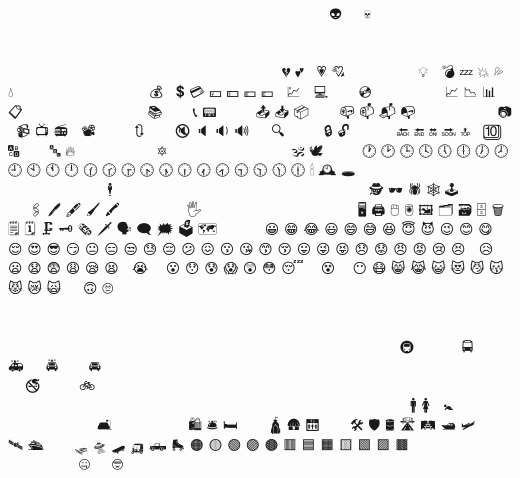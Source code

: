 \documentclass{article}
\begin{document}
👳🏼 👳🏽‍♀️ 👳🏽‍♂️ 👳🏽 👳🏾‍♀️ 👳🏾‍♂️ 👳🏾 👳🏿‍♀️ 👳🏿‍♂️ 👳🏿 👳‍♀️ 👳‍♂️ 👳 👴🏻 👴🏼 👴🏽 👴🏾 👴🏿 👴 👵🏻 👵🏼 👵🏽 👵🏾 👵🏿 👵 👶🏻 👶🏼 👶🏽 👶🏾 👶🏿 👶 👷🏻‍♀️ 👷🏻‍♂️ 👷🏻 👷🏼‍♀️ 👷🏼‍♂️ 👷🏼 👷🏽‍♀️ 👷🏽‍♂️ 👷🏽 👷🏾‍♀️ 👷🏾‍♂️ 👷🏾 👷🏿‍♀️ 👷🏿‍♂️ 👷🏿 👷‍♀️ 👷‍♂️ 👷 👸🏻 👸🏼 👸🏽 👸🏾 👸🏿 👸 👹 👺 👻 👼🏻 👼🏼 👼🏽 👼🏾 👼🏿 👼 👽 👾 👿 💀 💁🏻‍♀️ 💁🏻‍♂️ 💁🏻 💁🏼‍♀️ 💁🏼‍♂️ 💁🏼 💁🏽‍♀️ 💁🏽‍♂️ 💁🏽 💁🏾‍♀️ 💁🏾‍♂️ 💁🏾 💁🏿‍♀️ 💁🏿‍♂️ 💁🏿 💁‍♀️ 💁‍♂️ 💁 💂🏻‍♀️ 💂🏻‍♂️ 💂🏻 💂🏼‍♀️ 💂🏼‍♂️ 💂🏼 💂🏽‍♀️ 💂🏽‍♂️ 💂🏽 💂🏾‍♀️ 💂🏾‍♂️ 💂🏾 💂🏿‍♀️ 💂🏿‍♂️ 💂🏿 💂‍♀️ 💂‍♂️ 💂 💃🏻 💃🏼 💃🏽 💃🏾 💃🏿 💃 💄 💅🏻 💅🏼 💅🏽 💅🏾 💅🏿 💅 💆🏻‍♀️ 💆🏻‍♂️ 💆🏻 💆🏼‍♀️ 💆🏼‍♂️ 💆🏼 💆🏽‍♀️ 💆🏽‍♂️ 💆🏽 💆🏾‍♀️ 💆🏾‍♂️ 💆🏾 💆🏿‍♀️ 💆🏿‍♂️ 💆🏿 💆‍♀️ 💆‍♂️ 💆 💇🏻‍♀️ 💇🏻‍♂️ 💇🏻 💇🏼‍♀️ 💇🏼‍♂️ 💇🏼 💇🏽‍♀️ 💇🏽‍♂️ 💇🏽 💇🏾‍♀️ 💇🏾‍♂️ 💇🏾 💇🏿‍♀️ 💇🏿‍♂️ 💇🏿 💇‍♀️ 💇‍♂️ 💇 💈 💉 💊 💋 💌 💍 💎 💏🏻 💏🏼 💏🏽 💏🏾 💏🏿 💏 💐 💑🏻 💑🏼 💑🏽 💑🏾 💑🏿 💑 💒 💓 💔 💕 💖 💗 💘 💙 💚 💛 💜 💝 💞 💟 💠 💡 💢 💣 💤 💥 💦 💧 💨 💩 💪🏻 💪🏼 💪🏽 💪🏾 💪🏿 💪 💫 💬 💭 💮 💯 💰 💱 💲 💳 💴 💵 💶 💷 💸 💹 💺 💻 💼 💽 💾 💿 📀 📁 📂 📃 📄 📅 📆 📇 📈 📉 📊 📋 📌 📍 📎 📏 📐 📑 📒 📓 📔 📕 📖 📗 📘 📙 📚 📛 📜 📝 📞 📟 📠 📡 📢 📣 📤 📥 📦 📧 📨 📩 📪 📫 📬 📭 📮 📯 📰 📱 📲 📳 📴 📵 📶 📷 📸 📹 📺 📻 📼 📽 📿 🔀 🔁 🔂 🔃 🔄 🔅 🔆 🔇 🔈 🔉 🔊 🔋 🔌 🔍 🔎 🔏 🔐 🔑 🔒 🔓 🔔 🔕 🔖 🔗 🔘 🔙 🔚 🔛 🔜 🔝 🔞 🔟 🔠 🔡 🔢 🔣 🔤 🔥 🔦 🔧 🔨 🔩 🔪 🔫 🔬 🔭 🔮 🔯 🔰 🔱 🔲 🔳 🔴 🔵 🔶 🔷 🔸 🔹 🔺 🔻 🔼 🔽 🕉 🕊 🕋 🕌 🕍 🕎 🕐 🕑 🕒 🕓 🕔 🕕 🕖 🕗 🕘 🕙 🕚 🕛 🕜 🕝 🕞 🕟 🕠 🕡 🕢 🕣 🕤 🕥 🕦 🕧 🕯 🕰 🕳 🕴🏻‍♀️ 🕴🏻‍♂️ 🕴🏻 🕴🏼‍♀️ 🕴🏼‍♂️ 🕴🏼 🕴🏽‍♀️ 🕴🏽‍♂️ 🕴🏽 🕴🏾‍♀️ 🕴🏾‍♂️ 🕴🏾 🕴🏿‍♀️ 🕴🏿‍♂️ 🕴🏿 🕴️‍♀️ 🕴️‍♂️ 🕴 🕵🏻‍♀️ 🕵🏻‍♂️ 🕵🏻 🕵🏼‍♀️ 🕵🏼‍♂️ 🕵🏼 🕵🏽‍♀️ 🕵🏽‍♂️ 🕵🏽 🕵🏾‍♀️ 🕵🏾‍♂️ 🕵🏾 🕵🏿‍♀️ 🕵🏿‍♂️ 🕵🏿 🕵️‍♀️ 🕵️‍♂️ 🕵 🕶 🕷 🕸 🕹 🕺🏻 🕺🏼 🕺🏽 🕺🏾 🕺🏿 🕺 🖇 🖊 🖋 🖌 🖍 🖐🏻 🖐🏼 🖐🏽 🖐🏾 🖐🏿 🖐 🖕🏻 🖕🏼 🖕🏽 🖕🏾 🖕🏿 🖕 🖖🏻 🖖🏼 🖖🏽 🖖🏾 🖖🏿 🖖 🖤 🖥 🖨 🖱 🖲 🖼 🗂 🗃 🗄 🗑 🗒 🗓 🗜 🗝 🗞 🗡 🗣 🗨 🗯 🗳 🗺 🗻 🗼 🗽 🗾 🗿 😀 😁 😂 😃 😄 😅 😆 😇 😈 😉 😊 😋 😌 😍 😎 😏 😐 😑 😒 😓 😔 😕 😖 😗 😘 😙 😚 😛 😜 😝 😞 😟 😠 😡 😢 😣 😤 😥 😦 😧 😨 😩 😪 😫 😬 😭 😮‍💨 😮 😯 😰 😱 😲 😳 😴 😵‍💫 😵 😶‍🌫️ 😶 😷 😸 😹 😺 😻 😼 😽 😾 😿 🙀 🙁 🙂 🙃 🙄 🙅🏻‍♀️ 🙅🏻‍♂️ 🙅🏻 🙅🏼‍♀️ 🙅🏼‍♂️ 🙅🏼 🙅🏽‍♀️ 🙅🏽‍♂️ 🙅🏽 🙅🏾‍♀️ 🙅🏾‍♂️ 🙅🏾 🙅🏿‍♀️ 🙅🏿‍♂️ 🙅🏿 🙅‍♀️ 🙅‍♂️ 🙅 🙆🏻‍♀️ 🙆🏻‍♂️ 🙆🏻 🙆🏼‍♀️ 🙆🏼‍♂️ 🙆🏼 🙆🏽‍♀️ 🙆🏽‍♂️ 🙆🏽 🙆🏾‍♀️ 🙆🏾‍♂️ 🙆🏾 🙆🏿‍♀️ 🙆🏿‍♂️ 🙆🏿 🙆‍♀️ 🙆‍♂️ 🙆 🙇🏻‍♀️ 🙇🏻‍♂️ 🙇🏻 🙇🏼‍♀️ 🙇🏼‍♂️ 🙇🏼 🙇🏽‍♀️ 🙇🏽‍♂️ 🙇🏽 🙇🏾‍♀️ 🙇🏾‍♂️ 🙇🏾 🙇🏿‍♀️ 🙇🏿‍♂️ 🙇🏿 🙇‍♀️ 🙇‍♂️ 🙇 🙈 🙉 🙊 🙋🏻‍♀️ 🙋🏻‍♂️ 🙋🏻 🙋🏼‍♀️ 🙋🏼‍♂️ 🙋🏼 🙋🏽‍♀️ 🙋🏽‍♂️ 🙋🏽 🙋🏾‍♀️ 🙋🏾‍♂️ 🙋🏾 🙋🏿‍♀️ 🙋🏿‍♂️ 🙋🏿 🙋‍♀️ 🙋‍♂️ 🙋 🙌🏻 🙌🏼 🙌🏽 🙌🏾 🙌🏿 🙌 🙍🏻‍♀️ 🙍🏻‍♂️ 🙍🏻 🙍🏼‍♀️ 🙍🏼‍♂️ 🙍🏼 🙍🏽‍♀️ 🙍🏽‍♂️ 🙍🏽 🙍🏾‍♀️ 🙍🏾‍♂️ 🙍🏾 🙍🏿‍♀️ 🙍🏿‍♂️ 🙍🏿 🙍‍♀️ 🙍‍♂️ 🙍 🙎🏻‍♀️ 🙎🏻‍♂️ 🙎🏻 🙎🏼‍♀️ 🙎🏼‍♂️ 🙎🏼 🙎🏽‍♀️ 🙎🏽‍♂️ 🙎🏽 🙎🏾‍♀️ 🙎🏾‍♂️ 🙎🏾 🙎🏿‍♀️ 🙎🏿‍♂️ 🙎🏿 🙎‍♀️ 🙎‍♂️ 🙎 🙏🏻 🙏🏼 🙏🏽 🙏🏾 🙏🏿 🙏 🚀 🚁 🚂 🚃 🚄 🚅 🚆 🚇 🚈 🚉 🚊 🚋 🚌 🚍 🚎 🚏 🚐 🚑 🚒 🚓 🚔 🚕 🚖 🚗 🚘 🚙 🚚 🚛 🚜 🚝 🚞 🚟 🚠 🚡 🚢 🚣🏻‍♀️ 🚣🏻‍♂️ 🚣🏻 🚣🏼‍♀️ 🚣🏼‍♂️ 🚣🏼 🚣🏽‍♀️ 🚣🏽‍♂️ 🚣🏽 🚣🏾‍♀️ 🚣🏾‍♂️ 🚣🏾 🚣🏿‍♀️ 🚣🏿‍♂️ 🚣🏿 🚣‍♀️ 🚣‍♂️ 🚣 🚤 🚥 🚦 🚧 🚨 🚩 🚪 🚫 🚬 🚭 🚮 🚯 🚰 🚱 🚲 🚳 🚴🏻‍♀️ 🚴🏻‍♂️ 🚴🏻 🚴🏼‍♀️ 🚴🏼‍♂️ 🚴🏼 🚴🏽‍♀️ 🚴🏽‍♂️ 🚴🏽 🚴🏾‍♀️ 🚴🏾‍♂️ 🚴🏾 🚴🏿‍♀️ 🚴🏿‍♂️ 🚴🏿 🚴‍♀️ 🚴‍♂️ 🚴 🚵🏻‍♀️ 🚵🏻‍♂️ 🚵🏻 🚵🏼‍♀️ 🚵🏼‍♂️ 🚵🏼 🚵🏽‍♀️ 🚵🏽‍♂️ 🚵🏽 🚵🏾‍♀️ 🚵🏾‍♂️ 🚵🏾 🚵🏿‍♀️ 🚵🏿‍♂️ 🚵🏿 🚵‍♀️ 🚵‍♂️ 🚵 🚶🏻‍♀️ 🚶🏻‍♂️ 🚶🏻 🚶🏼‍♀️ 🚶🏼‍♂️ 🚶🏼 🚶🏽‍♀️ 🚶🏽‍♂️ 🚶🏽 🚶🏾‍♀️ 🚶🏾‍♂️ 🚶🏾 🚶🏿‍♀️ 🚶🏿‍♂️ 🚶🏿 🚶‍♀️ 🚶‍♂️ 🚶 🚷 🚸 🚹 🚺 🚻 🚼 🚽 🚾 🚿 🛀🏻 🛀🏼 🛀🏽 🛀🏾 🛀🏿 🛀 🛁 🛂 🛃 🛄 🛅 🛋 🛌🏻 🛌🏼 🛌🏽 🛌🏾 🛌🏿 🛌 🛍 🛎 🛏 🛐 🛑 🛒 🛕 🛖 🛗 🛝 🛞 🛟 🛠 🛡 🛢 🛣 🛤 🛥 🛩 🛫 🛬 🛰 🛳 🛴 🛵 🛶 🛷 🛸 🛹 🛺 🛻 🛼 🟠 🟡 🟢 🟣 🟤 🟥 🟦 🟧 🟨 🟩 🟪 🟫 🟰 🤌🏻 🤌🏼 🤌🏽 🤌🏾 🤌🏿 🤌 🤍 🤎 🤏🏻 🤏🏼 🤏🏽 🤏🏾 🤏🏿 🤏 🤐 🤑 🤒 🤓 🤔 🤕 🤖 🤗 🤘🏻 🤘🏼 🤘🏽 🤘🏾 🤘🏿 🤘 🤙🏻 🤙🏼 🤙🏽 🤙🏾 🤙🏿 🤙 🤚🏻 🤚🏼 🤚🏽 🤚🏾 🤚🏿 🤚 🤛🏻 🤛🏼 🤛🏽 🤛🏾 🤛🏿 🤛 🤜🏻 🤜🏼 🤜🏽 🤜🏾 🤜🏿 🤜 🤝🏻 🤝🏼 🤝🏽 🤝🏾 🤝🏿 🤝 🤞🏻 🤞🏼 🤞🏽 🤞🏾 🤞🏿 🤞 🤟🏻 🤟🏼 🤟🏽 🤟🏾 🤟🏿 🤟 🤠 🤡 🤢 🤣 🤤 🤥 🤦🏻‍♀️ 🤦🏻‍♂️ 🤦🏻 🤦🏼‍♀️ 🤦🏼‍♂️ 🤦🏼 🤦🏽‍♀️ 🤦🏽‍♂️ 🤦🏽 🤦🏾‍♀️ 🤦🏾‍♂️ 🤦🏾 🤦🏿‍♀️ 🤦🏿‍♂️ 🤦🏿 🤦‍♀️ 🤦‍♂️ 🤦 🤧 🤨 🤩 🤪 🤫 🤬 🤭 🤮 🤯 🤰🏻 🤰🏼 🤰🏽 🤰🏾 🤰🏿 🤰 🤱🏻 🤱🏼 🤱🏽 🤱🏾 🤱🏿 🤱 🤲🏻 🤲🏼 🤲🏽 🤲🏾 🤲🏿 🤲 🤳🏻 🤳🏼 🤳🏽 🤳🏾 🤳🏿 🤳 🤴🏻 🤴🏼 🤴🏽 🤴🏾 🤴🏿 🤴 🤵🏻‍♀️ 🤵🏻‍♂️ 🤵🏻 🤵🏼‍♀️ 🤵🏼‍♂️ 🤵🏼 🤵🏽‍♀️ 🤵🏽‍♂️ 🤵🏽 🤵🏾‍♀️ 🤵🏾‍♂️ 🤵🏾 🤵🏿‍♀️ 🤵🏿‍♂️ 🤵🏿 🤵‍♀️ 🤵‍♂️ 🤵 🤶🏻 🤶🏼 🤶🏽 🤶🏾 🤶🏿 🤶 🤷🏻‍♀️ 🤷🏻‍♂️ 🤷🏻 🤷🏼‍♀️ 🤷🏼‍♂️ 🤷🏼 🤷🏽‍♀️ 🤷🏽‍♂️ 🤷🏽 🤷🏾‍♀️ 🤷🏾‍♂️ 🤷🏾 🤷🏿‍♀️ 🤷🏿‍♂️ 🤷🏿 🤷‍♀️ 🤷‍♂️ 🤷 🤸🏻‍♀️ 🤸🏻‍♂️ 🤸🏻 
\end{document}

